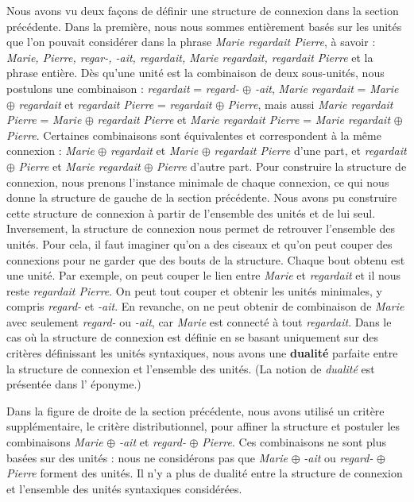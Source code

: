 Nous avons vu deux façons de définir une structure de connexion dans la section précédente. Dans la première, nous nous sommes entièrement basés sur les unités que l’on pouvait considérer dans la phrase \textit{Marie regardait Pierre}, à savoir : \textit{Marie, Pierre, regar-, -ait, regardait, Marie regardait, regardait Pierre} et la phrase entière. Dès qu’une unité est la combinaison de deux sous-unités, nous postulons une combinaison : \textit{regardait} = \textit{regard-} ${\oplus}$ \textit{{}-ait}, \textit{Marie regardait} = \textit{Marie} ${\oplus}$ \textit{regardait} et \textit{regardait Pierre} = \textit{regardait} ${\oplus}$ \textit{Pierre}, mais aussi \textit{Marie regardait Pierre} = \textit{Marie} ${\oplus}$ \textit{regardait Pierre} et \textit{Marie regardait Pierre} = \textit{Marie regardait} ${\oplus}$ \textit{Pierre}. Certaines combinaisons sont équivalentes et correspondent à la même connexion : \textit{Marie} ${\oplus}$ \textit{regardait} et \textit{Marie} ${\oplus}$ \textit{regardait Pierre} d’une part, et \textit{regardait} ${\oplus}$ \textit{Pierre} et \textit{Marie regardait} ${\oplus}$ \textit{Pierre} d’autre part. Pour construire la structure de connexion, nous prenons l’instance minimale de chaque connexion, ce qui nous donne la structure de gauche de la section précédente. Nous avons pu construire cette structure de connexion à partir de l’ensemble des unités et de lui seul. Inversement, la structure de connexion nous permet de retrouver l’ensemble des unités. Pour cela, il faut imaginer qu’on a des ciseaux et qu’on peut couper des connexions pour ne garder que des bouts de la structure. Chaque bout obtenu est une unité. Par exemple, on peut couper le lien entre \textit{Marie} et \textit{regardait} et il nous reste \textit{regardait Pierre}. On peut tout couper et obtenir les unités minimales, y compris \textit{regard-} et \-\textit{{}-ait}. En revanche, on ne peut obtenir de combinaison de \textit{Marie} avec seulement \textit{regard-} ou \-\textit{{}-ait}, car \textit{Marie} est connecté à tout \textit{regardait}. Dans le cas où la structure de connexion est définie en se basant uniquement sur des critères définissant les unités syntaxiques, nous avons une \textbf{dualité} parfaite entre la structure de connexion et l’ensemble des unités. (La notion de \textit{dualité} est présentée dans l’ éponyme.)

Dans la figure de droite de la section précédente, nous avons utilisé un critère supplémentaire, le critère distributionnel, pour affiner la structure et postuler les combinaisons \textit{Marie} ${\oplus}$ \textit{-ait} et \textit{regard-} ${\oplus}$ \textit{Pierre}. Ces combinaisons ne sont plus basées sur des unités : nous ne considérons pas que \textit{Marie} ${\oplus}$ \textit{-ait} ou \textit{regard-} ${\oplus}$ \textit{Pierre} forment des unités. Il n’y a plus de dualité entre la structure de connexion et l’ensemble des unités syntaxiques considérées.


